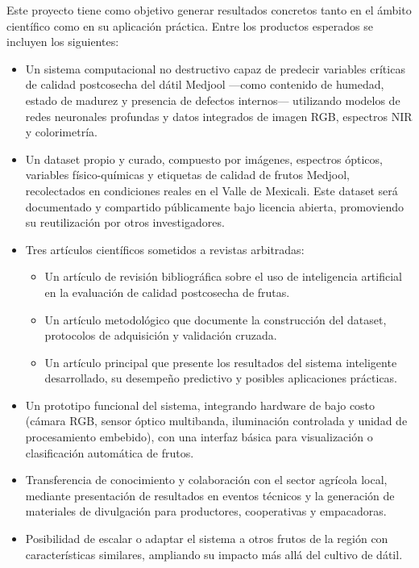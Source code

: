 Este proyecto tiene como objetivo generar resultados concretos tanto en el ámbito científico como en su aplicación práctica. Entre los productos esperados se incluyen los siguientes:

\begin{itemize}
    \item Un sistema computacional no destructivo capaz de predecir variables críticas de calidad postcosecha del dátil Medjool —como contenido de humedad, estado de madurez y presencia de defectos internos— utilizando modelos de redes neuronales profundas y datos integrados de imagen RGB, espectros NIR y colorimetría.
    \item Un dataset propio y curado, compuesto por imágenes, espectros ópticos, variables físico-químicas y etiquetas de calidad de frutos Medjool, recolectados en condiciones reales en el Valle de Mexicali. Este dataset será documentado y compartido públicamente bajo licencia abierta, promoviendo su reutilización por otros investigadores.
    \item Tres artículos científicos sometidos a revistas arbitradas:
    \begin{itemize}
        \item Un artículo de revisión bibliográfica sobre el uso de inteligencia artificial en la evaluación de calidad postcosecha de frutas.
        \item Un artículo metodológico que documente la construcción del dataset, protocolos de adquisición y validación cruzada.
        \item Un artículo principal que presente los resultados del sistema inteligente desarrollado, su desempeño predictivo y posibles aplicaciones prácticas.
    \end{itemize}
    \item Un prototipo funcional del sistema, integrando hardware de bajo costo (cámara RGB, sensor óptico multibanda, iluminación controlada y unidad de procesamiento embebido), con una interfaz básica para visualización o clasificación automática de frutos.
    \item Transferencia de conocimiento y colaboración con el sector agrícola local, mediante presentación de resultados en eventos técnicos y la generación de materiales de divulgación para productores, cooperativas y empacadoras.
    \item Posibilidad de escalar o adaptar el sistema a otros frutos de la región con características similares, ampliando su impacto más allá del cultivo de dátil.
\end{itemize}
